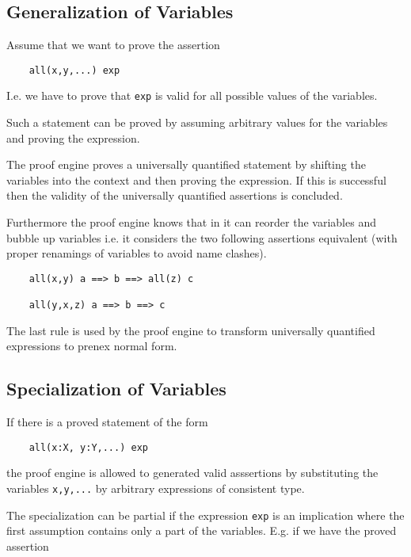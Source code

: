 \subsection{Generalization of Variables}

Assume that we want to prove the assertion

\begin{lstlisting}
    all(x,y,...) exp
\end{lstlisting}

I.e. we have to prove that \lstinline!exp! is valid for all possible values of the
variables.

Such a statement can be proved by assuming arbitrary values for the
variables and proving the expression.

The proof engine proves a universally quantified statement by shifting the
variables into the context and then proving the expression. If this is
successful then the validity of the universally quantified assertions is
concluded.

Furthermore the proof engine knows that in it can reorder the variables and
bubble up variables i.e. it considers the two following assertions equivalent
(with proper renamings of variables to avoid name clashes).

\begin{lstlisting}
    all(x,y) a ==> b ==> all(z) c

    all(y,x,z) a ==> b ==> c
\end{lstlisting}

The last rule is used by the proof engine to transform universally quantified
expressions to prenex normal form.



\subsection{Specialization of Variables}

If there is a proved statement of the form
\begin{lstlisting}
    all(x:X, y:Y,...) exp
\end{lstlisting}
%
the proof engine is allowed to generated valid asssertions by substituting the
variables \lstinline!x,y,...! by arbitrary expressions of consistent type.

The specialization can be partial if the expression \lstinline!exp! is an
implication where the first assumption contains only a part of the
variables. E.g. if we have the proved assertion

